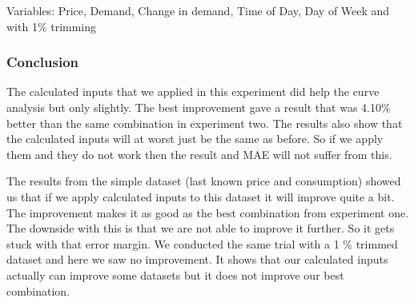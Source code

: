 Variables: Price, Demand, Change in demand, Time of Day, Day of Week and with 1\% trimming
\begin{table}[H]
\centering  %
\caption{Scatter text~\cite{singhal2011electricity} with other calculated inputs and 1\% trim} %
\label{table:scatter_text_1p_trim} %
\end{table}

\subsubsection{Conclusion}
The calculated inputs that we applied in this experiment did help the curve analysis but only slightly. The best improvement gave a result that was 4.10\% better than the same combination in experiment two. The results also show that the calculated inputs will at worst just be the same as before. So if we apply them and they do not work then the result and MAE will not suffer from this.

The results from the simple dataset (last known price and consumption) showed us that if we apply calculated inputs to this dataset it will improve quite a bit. The improvement makes it as good as the best combination from experiment one. The downside with this is that we are not able to improve it further. So it gets stuck with that error margin. We conducted the same trial with a 1 \% trimmed dataset and here we saw no improvement. It shows that our calculated inputs actually can improve some datasets but it does not improve our best combination.


